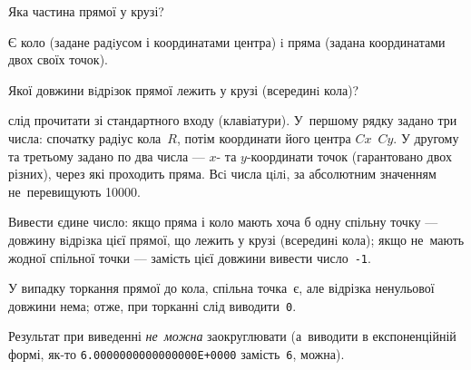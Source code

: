 ﻿\begin{problemAllDefault}{Яка частина прямої у крузі?}

Є коло (задане радiусом і координатами центра) i пряма (задана координатами двох своїх точок).

Якої довжини вiдрiзок прямої лежить у крузі (всерединi кола)?

\InputFile слід прочитати зі стандартного входу (клавіатури). У~першому рядку задано три числа: спочатку радіус кола~$R$, потім координати його центра $Cx$~$Cy$. У другому та третьому задано по два числа --- $x$- та $y$-координати точок (гарантовано двох різних), через які проходить пряма. Всi числа цiлi, за абсолютним значенням не~перевищують 10000.

\OutputFile Вивести єдине число: якщо пряма і коло мають хоча б одну спільну точку --- довжину вiдрiзка цієї прямої, що лежить у крузі (всерединi кола); якщо не~мають жодної спільної точки --- замість цієї довжини вивести число~\texttt{-1}.

У випадку торкання прямої до кола, спільна точка~є, але відрізка ненульової довжини нема; отже, при торканні слід виводити~\texttt{0}.

Результат при виведенні \emph{не~можна} заокруглювати (а~виводити в експоненційній формі, як-то \texttt{6.0000000000000000E+0000} замість~\texttt{6}, можна).


\Example

\begin{example}
\end{example}

\end{problemAllDefault}
